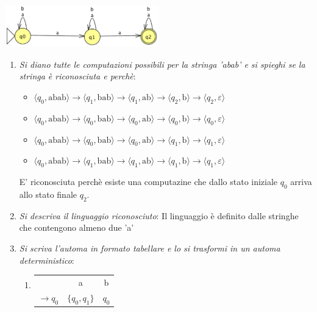 \documentclass[12pt, a4paper]{report}
\begin{document}
        \begin{exercise}
            \textit{}
            \begin{center}
                \includegraphics[width=0.5\textwidth]{Images/nfaluglio2022.png}
            \end{center}
            \begin{enumerate}
                \item \textit{Si diano tutte le computazioni possibili per la stringa 'abab' e si spieghi se la stringa è riconosciuta e perchè}: \begin{itemize}
                    \item $\langle q_0,\text{abab}\rangle\to\langle q_1,\text{bab}\rangle\to\langle q_1,\text{ab}\rangle\to\langle q_2,\text{b}\rangle\to\langle q_2,\varepsilon\rangle$
                    \item $\langle q_0,\text{abab}\rangle\to\langle q_0,\text{bab}\rangle\to\langle q_0,\text{ab}\rangle\to\langle q_0,\text{b}\rangle\to\langle q_0,\varepsilon\rangle$
                    \item $\langle q_0,\text{abab}\rangle\to\langle q_0,\text{bab}\rangle\to\langle q_0,\text{ab}\rangle\to\langle q_1,\text{b}\rangle\to\langle q_1,\varepsilon\rangle$
                    \item $\langle q_0,\text{abab}\rangle\to\langle q_1,\text{bab}\rangle\to\langle q_1,\text{ab}\rangle\to\langle q_1,\text{b}\rangle\to\langle q_1,\varepsilon\rangle$
                \end{itemize} 
                E' riconosciuta perchè esiste una computazine che dallo stato iniziale $q_0$ arriva allo stato finale $q_2$.
                \item \textit{Si descriva il linguaggio riconosciuto}: Il linguaggio è definito dalle stringhe che contengono almeno due 'a'
                \item \textit{Si scriva l'automa in formato tabellare e lo si trasformi in un automa deterministico}: \begin{enumerate}
                    \item \begin{tabular}{|c | c | c |}
                        \hline
                        & a & b \\
                        $\to q_0$ & $\{q_0,q_1\}$ & $q_0$ \\

\end{tabular}
\end{enumerate}
\end{enumerate}
\end{exercise}
\end{document}
